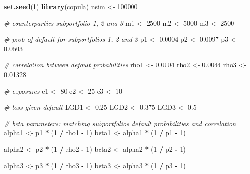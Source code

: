 \documentclass[
]{article}
\newenvironment{Shaded}{\begin{snugshade}}{\end{snugshade}}
\newcommand{\CommentTok}[1]{\textcolor[rgb]{0.56,0.35,0.01}{\textit{#1}}}
\newcommand{\DecValTok}[1]{\textcolor[rgb]{0.00,0.00,0.81}{#1}}
\newcommand{\FloatTok}[1]{\textcolor[rgb]{0.00,0.00,0.81}{#1}}
\newcommand{\KeywordTok}[1]{\textcolor[rgb]{0.13,0.29,0.53}{\textbf{#1}}}
\newcommand{\NormalTok}[1]{#1}
\newcommand{\OperatorTok}[1]{\textcolor[rgb]{0.81,0.36,0.00}{\textbf{#1}}}
\newcommand{\StringTok}[1]{\textcolor[rgb]{0.31,0.60,0.02}{#1}}
\begin{document}
\begin{Shaded}
\begin{Highlighting}[]
  \KeywordTok{set.seed}\NormalTok{(}\DecValTok{1}\NormalTok{)}
  \KeywordTok{library}\NormalTok{(copula)}
\NormalTok{  nsim <-}\StringTok{ }\DecValTok{100000}
  
\CommentTok{# counterparties subportfolio 1, 2 and 3}
\NormalTok{  m1 <-}\StringTok{ }\DecValTok{2500}
\NormalTok{  m2 <-}\StringTok{ }\DecValTok{5000}
\NormalTok{  m3 <-}\StringTok{ }\DecValTok{2500}
  
  \CommentTok{# prob of default for subportfolios 1, 2 and 3}
\NormalTok{  p1 <-}\StringTok{ }\FloatTok{0.0004} 
\NormalTok{  p2 <-}\StringTok{ }\FloatTok{0.0097} 
\NormalTok{  p3 <-}\StringTok{ }\FloatTok{0.0503}  
  
  \CommentTok{# correlation between default probabilities}
\NormalTok{  rho1 <-}\StringTok{ }\FloatTok{0.0004}
\NormalTok{  rho2 <-}\StringTok{ }\FloatTok{0.0044}
\NormalTok{  rho3 <-}\StringTok{ }\FloatTok{0.01328}
  
\CommentTok{# exposures}
\NormalTok{  e1 <-}\StringTok{ }\DecValTok{80}
\NormalTok{  e2 <-}\StringTok{ }\DecValTok{25} 
\NormalTok{  e3 <-}\StringTok{ }\DecValTok{10} 
  
\CommentTok{# loss given default}
\NormalTok{  LGD1 <-}\StringTok{ }\FloatTok{0.25}
\NormalTok{  LGD2 <-}\StringTok{ }\FloatTok{0.375}
\NormalTok{  LGD3 <-}\StringTok{ }\FloatTok{0.5}
  
\CommentTok{# beta parameters: matching subportfolios default probabilities and correlation}
\NormalTok{  alpha1 <-}\StringTok{ }\NormalTok{p1 }\OperatorTok{*}\StringTok{ }\NormalTok{(}\DecValTok{1} \OperatorTok{/}\StringTok{ }\NormalTok{rho1 }\OperatorTok{-}\StringTok{ }\DecValTok{1}\NormalTok{)}
\NormalTok{  beta1 <-}\StringTok{ }\NormalTok{alpha1 }\OperatorTok{*}\StringTok{ }\NormalTok{(}\DecValTok{1} \OperatorTok{/}\StringTok{ }\NormalTok{p1 }\OperatorTok{-}\StringTok{ }\DecValTok{1}\NormalTok{)}
  
\NormalTok{  alpha2 <-}\StringTok{ }\NormalTok{p2 }\OperatorTok{*}\StringTok{ }\NormalTok{(}\DecValTok{1} \OperatorTok{/}\StringTok{ }\NormalTok{rho2 }\OperatorTok{-}\StringTok{ }\DecValTok{1}\NormalTok{)}
\NormalTok{  beta2 <-}\StringTok{ }\NormalTok{alpha2 }\OperatorTok{*}\StringTok{ }\NormalTok{(}\DecValTok{1} \OperatorTok{/}\StringTok{ }\NormalTok{p2 }\OperatorTok{-}\StringTok{ }\DecValTok{1}\NormalTok{)}
  
\NormalTok{  alpha3 <-}\StringTok{ }\NormalTok{p3 }\OperatorTok{*}\StringTok{ }\NormalTok{(}\DecValTok{1} \OperatorTok{/}\StringTok{ }\NormalTok{rho3 }\OperatorTok{-}\StringTok{ }\DecValTok{1}\NormalTok{)}
\NormalTok{  beta3 <-}\StringTok{ }\NormalTok{alpha3 }\OperatorTok{*}\StringTok{ }\NormalTok{(}\DecValTok{1} \OperatorTok{/}\StringTok{ }\NormalTok{p3 }\OperatorTok{-}\StringTok{ }\DecValTok{1}\NormalTok{)}
  

\end{Highlighting}
\end{Shaded}
\end{document}
